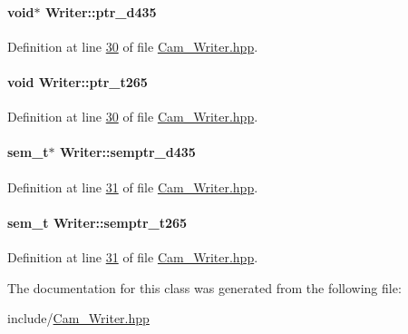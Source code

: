 \paragraph[{\texorpdfstring{ptr\+\_\+d435}{ptr_d435}}]{\setlength{\rightskip}{0pt plus 5cm}void$\ast$ Writer\+::ptr\+\_\+d435}\hypertarget{classWriter_a860ca523e0f6572f5ff5b8ea1dfc9771}{}\label{classWriter_a860ca523e0f6572f5ff5b8ea1dfc9771}


Definition at line \hyperlink{Cam__Writer_8hpp_source_l00030}{30} of file \hyperlink{Cam__Writer_8hpp_source}{Cam\+\_\+\+Writer.\+hpp}.

\paragraph[{\texorpdfstring{ptr\+\_\+t265}{ptr_t265}}]{\setlength{\rightskip}{0pt plus 5cm}void Writer\+::ptr\+\_\+t265}\hypertarget{classWriter_a032ba2a2ddadb84b74359b9cb073793e}{}\label{classWriter_a032ba2a2ddadb84b74359b9cb073793e}


Definition at line \hyperlink{Cam__Writer_8hpp_source_l00030}{30} of file \hyperlink{Cam__Writer_8hpp_source}{Cam\+\_\+\+Writer.\+hpp}.

\paragraph[{\texorpdfstring{semptr\+\_\+d435}{semptr_d435}}]{\setlength{\rightskip}{0pt plus 5cm}sem\+\_\+t$\ast$ Writer\+::semptr\+\_\+d435}\hypertarget{classWriter_af8ffd0d121f0c5aed20140d69c2f0c45}{}\label{classWriter_af8ffd0d121f0c5aed20140d69c2f0c45}


Definition at line \hyperlink{Cam__Writer_8hpp_source_l00031}{31} of file \hyperlink{Cam__Writer_8hpp_source}{Cam\+\_\+\+Writer.\+hpp}.

\paragraph[{\texorpdfstring{semptr\+\_\+t265}{semptr_t265}}]{\setlength{\rightskip}{0pt plus 5cm}sem\+\_\+t Writer\+::semptr\+\_\+t265}\hypertarget{classWriter_a8858a86e7de822740c0aa52e6386cf58}{}\label{classWriter_a8858a86e7de822740c0aa52e6386cf58}


Definition at line \hyperlink{Cam__Writer_8hpp_source_l00031}{31} of file \hyperlink{Cam__Writer_8hpp_source}{Cam\+\_\+\+Writer.\+hpp}.



The documentation for this class was generated from the following file\+:\begin{DoxyCompactItemize}
\item 
include/\hyperlink{Cam__Writer_8hpp}{Cam\+\_\+\+Writer.\+hpp}\end{DoxyCompactItemize}
